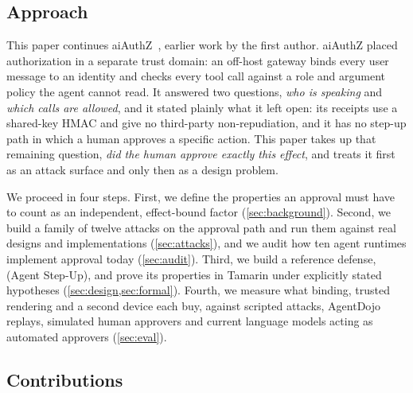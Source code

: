 \subsection{Approach}

This paper continues aiAuthZ~\citep{kodathala2026aiauthz}, earlier work by the first author. aiAuthZ placed authorization in a
separate trust domain: an off-host gateway binds every user message to an identity and checks every tool call
against a role and argument policy the agent cannot read. It answered two questions, \emph{who is speaking} and
\emph{which calls are allowed}, and it stated plainly what it left open: its receipts use a shared-key HMAC and give no third-party
non-repudiation, and it has no step-up path in which a human approves a specific action. This paper takes up
that remaining question, \emph{did the human approve exactly this effect}, and treats it first as an attack
surface and only then as a design problem.

We proceed in four steps. First, we define the properties an approval must have to count as an independent,
effect-bound factor (\cref{sec:background}). Second, we build a family of twelve attacks on the approval path and
run them against real designs and implementations (\cref{sec:attacks}), and we audit how ten agent runtimes
implement approval today (\cref{sec:audit}). Third, we build a reference defense, \sys{} (Agent Step-Up), and
prove its properties in Tamarin under explicitly stated hypotheses (\cref{sec:design,sec:formal}). Fourth, we
measure what binding, trusted rendering and a second device each buy, against scripted attacks, AgentDojo
replays, simulated human approvers and \llmModels{} current language models acting as automated approvers
(\cref{sec:eval}).

\subsection{Contributions}

